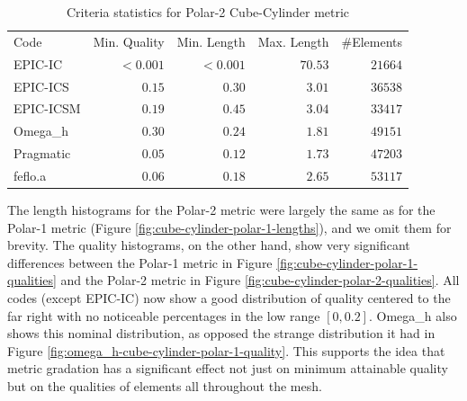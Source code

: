 \documentclass[3p,times,procedia,number]{elsarticle}
\begin{document}
\begin{table}
\caption{Criteria statistics for Polar-2 Cube-Cylinder metric}
\label{tab:polar-2-stats}
\begin{tabular}{lrrrr}
Code & Min. Quality & Min. Length & Max. Length & \#Elements\\
EPIC-IC    &$<0.001$&     $<0.001$&      $70.53$&    $21664$\\
EPIC-ICS   &$  0.15$&     $  0.30$&      $ 3.01$&    $36538$\\
EPIC-ICSM  &$  0.19$&     $  0.45$&      $ 3.04$&    $33417$\\
Omega\_h   &$  0.30$&     $  0.24$&      $ 1.81$&    $49151$\\
Pragmatic  &$  0.05$&     $  0.12$&      $ 1.73$&    $47203$\\
feflo.a    &$  0.06$&     $  0.18$&      $ 2.65$&    $53117$\\
\end{tabular}
\end{table}

The length histograms for the Polar-2 metric were largely the
same as for the Polar-1 metric
(Figure \ref{fig:cube-cylinder-polar-1-lengths}),
and we omit them for brevity.
The quality histograms, on the other hand, show very significant differences
between the Polar-1 metric in Figure \ref{fig:cube-cylinder-polar-1-qualities}
and the Polar-2 metric in Figure \ref{fig:cube-cylinder-polar-2-qualities}.
All codes (except EPIC-IC) now show a good distribution of quality centered to the
far right with no noticeable percentages in the low range $[0,0.2]$.
Omega\_h also shows this nominal distribution, as opposed the strange distribution
it had in Figure \ref{fig:omega_h-cube-cylinder-polar-1-quality}.
This supports the idea that metric gradation has a significant effect not just
on minimum attainable quality but on the qualities of elements all throughout the mesh.
\end{document}
